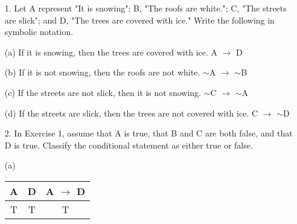 \documentclass{article}
\begin{document}
\begin{itemize}
    (b) One way to write the negation of the statement in (a) is: It is not true that Amelia made an A in mathematics or Amelia made a B in English.  Write the negation another way using De Morgan's Laws.\\
    $\sim$(\emph{p} $\vee$ \emph{q}) is equivalent to $\sim$\emph{p} $\wedge$ $\sim$\emph{q} therefore we could negate the statement in (a) by {\color{blue} Amelia didn't make in A in mathematics and she didn't make a B in English.}
    
    (c) Use one of De Morgan's Laws to write the negation of this statement: Ardie can pay me now, or Ardie will work for me later.\\
    \hspace*{1cm}\emph{p}: Ardie can pay me now.\\
    \hspace*{1cm}\emph{q}: Ardie will work for me later.\\
    $\sim$(\emph{p} $\vee$ \emph{q}) is equivalent to $\sim$\emph{p} $\wedge$ $\sim$\emph{q} therefore to negate the statements, we can write: {\color{blue} Ardie can't pay me now and Ardie can't work for me later.}
    
    \item[1.] Let A represent "It is snowing"; B, "The roofs are white."; C, "The streets are slick"; and D, "The trees are covered with ice." Write the following in symbolic notation. 
    
    (a) If it is snowing, then the trees are covered with ice. {\color{blue} A $\to$ D}
    
    (b) If it is not snowing, then the roofs are not white. {\color{blue} $\sim$A $\to$ $\sim$B}
    
    (c) If the streets are not slick, then it is not snowing. {\color{blue} $\sim$C $\to$ $\sim$A}
    
    (d) If the streets are slick, then the trees are not covered with ice. {\color{blue} C $\to$ $\sim$D}
    
    \item[2.] In Exercise 1, assume that A is true, that B and C are both false, and that D is true.  Classify the conditional statement as either true or false.
    
    (a) \begin{center}
        \begin{tabular}{|c|c|c|}
            \hline
            A & D & A $\to$ D \\
            \hline
            T & T & T\\
            \hline
        \end{tabular}
    \end{center}
    

\end{itemize}
\end{document}
